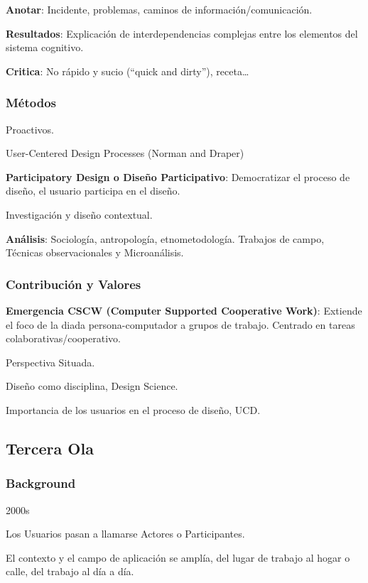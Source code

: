 \documentclass[12pt]{report} %
\begin{document}
\textbf{Anotar}: Incidente, problemas, caminos de
información/comunicación.

\textbf{Resultados}: Explicación de interdependencias complejas entre
los elementos del sistema cognitivo.

\textbf{Critica}: No rápido y sucio (``quick and dirty''),
receta\ldots{}

\subsubsection{Métodos}

Proactivos.

User-Centered Design Processes (Norman and Draper)

\textbf{Participatory Design o Diseño Participativo}: Democratizar el
proceso de diseño, el usuario participa en el diseño.

Investigación y diseño contextual.

\textbf{Análisis}: Sociología, antropología, etnometodología. Trabajos
de campo, Técnicas observacionales y Microanálisis.

\subsubsection{Contribución y Valores}

\textbf{Emergencia CSCW (Computer Supported Cooperative Work)}: Extiende
el foco de la diada persona-computador a grupos de trabajo. Centrado en
tareas colaborativas/cooperativo.

Perspectiva Situada.

Diseño como disciplina, Design Science.

Importancia de los usuarios en el proceso de diseño, UCD.

\subsection{Tercera Ola}


\subsubsection{Background}

2000s

Los Usuarios pasan a llamarse Actores o Participantes.

El contexto y el campo de aplicación se amplía, del lugar de trabajo al
hogar o calle, del trabajo al día a día.
\end{document}
